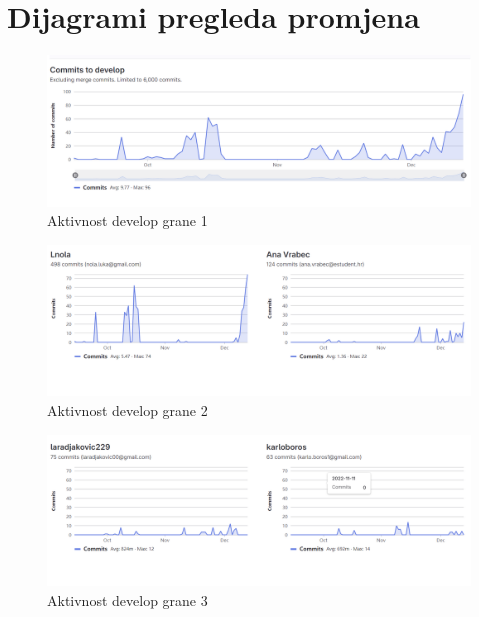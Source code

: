 					
		\eject
		\section*{Dijagrami pregleda promjena}
		
		
		\begin{figure}[H]
			\includegraphics[scale=0.6]{slike/git1.png} %
			\centering
			\caption{Aktivnost develop grane 1}
			\label{fig:aktivnost1}
		\end{figure}
		\begin{figure}[H]
			\includegraphics[scale=0.6]{slike/git2.png} %
			\centering
			\caption{Aktivnost develop grane 2}
			\label{fig:aktivnost2}
		\end{figure}
		\begin{figure}[H]
			\includegraphics[scale=0.6]{slike/git3.png} %
			\centering
			\caption{Aktivnost develop grane 3}
			\label{fig:aktivnost3}
		\end{figure}

